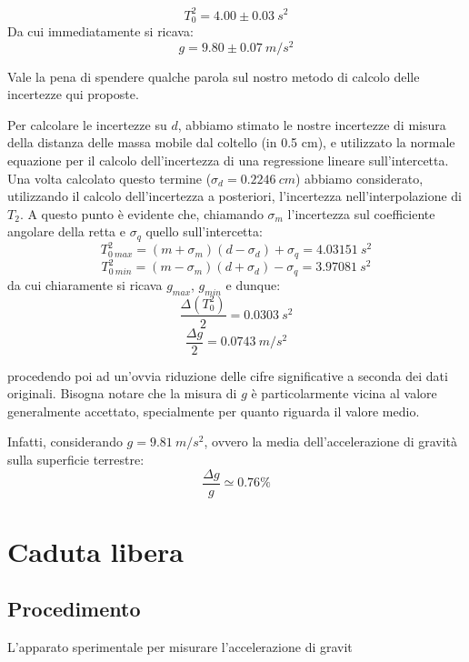$$T_0^2 = 4.00\pm 0.03\ s^2$$
Da cui immediatamente si ricava:
$$g = 9.80 \pm 0.07\ m/s^2$$

Vale la pena di spendere qualche parola sul nostro metodo di calcolo delle incertezze qui proposte.

Per calcolare le incertezze su $d$, abbiamo stimato le nostre incertezze di misura della distanza delle massa mobile dal coltello (in 0.5 cm), e utilizzato la normale equazione per il calcolo dell'incertezza di una regressione lineare sull'intercetta.
Una volta calcolato questo termine ($\sigma_d = 0.2246\ cm$) abbiamo considerato, utilizzando il calcolo dell'incertezza a posteriori, l'incertezza nell'interpolazione di $T_2$. A questo punto è evidente che, chiamando $\sigma_m$ l'incertezza sul coefficiente angolare della retta e $\sigma_q$ quello sull'intercetta:
$$T^2_{0\ max} = (m+\sigma_m)(d-\sigma_d) + \sigma_q = 4.03151\ s^2$$
$$T^2_{0\ min} = (m-\sigma_m)(d+\sigma_d) - \sigma_q = 3.97081\ s^2$$
da cui chiaramente si ricava $g_{max}$, $g_{min}$ e dunque:
$$\frac{\Delta (T_0^2)}{2} = 0.0303\ s^2$$
$$\frac{\Delta g}{2} = 0.0743\ m/s^2 $$

procedendo poi ad un'ovvia riduzione delle cifre significative a seconda dei dati originali. Bisogna notare che la misura di $g$ è particolarmente vicina al valore generalmente accettato, specialmente per quanto riguarda il valore medio.

Infatti, considerando $g=9.81\ m/s^2$, ovvero la media dell'accelerazione di gravità sulla superficie terrestre:
$$\frac{\Delta g}{g} \simeq 0.76\% $$


\section{Caduta libera}
\subsection{Procedimento}
L'apparato sperimentale per misurare l'accelerazione di gravit
